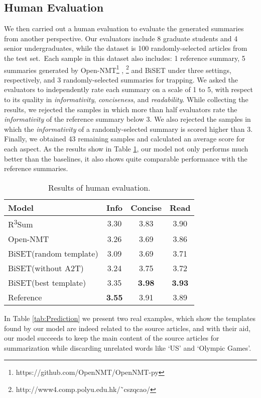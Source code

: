 \documentclass[11pt,a4paper]{article}
\begin{document}
\begin{spacing}{1.0}
\subsection{Human Evaluation}
We then carried out a human evaluation to evaluate the generated summaries from another perspective. Our evaluators include 8 graduate students and 4 senior undergraduates, while the dataset is 100 randomly-selected articles from the test set.~Each sample in this dataset also includes: 1 reference summary, 5 summaries generated by Open-NMT\footnote{https://github.com/OpenNMT/OpenNMT-py} \cite{opennmt}, \footnote{http://www4.comp.polyu.edu.hk/˜cszqcao/} \cite{cao2018retrieve} and BiSET under three settings, respectively, and 3 randomly-selected summaries for trapping. We asked the evaluators to independently rate each summary on a scale of 1 to 5, with respect to its quality in \emph{informativity}, \emph{conciseness}, and \emph{readability}. While collecting the results, we rejected the samples in which more than half evaluators rate the \emph{informativity} of the reference summary below 3. We also rejected the samples in which the \emph{informativity} of a randomly-selected summary is scored higher than 3. Finally, we obtained 43 remaining samples and calculated an average score for each aspect. As the results show in Table \ref{tab:human evaluation}, our model not only performs much better than the baselines, it also shows quite comparable performance with the reference summaries.


\begin{table}[h]
	\centering
	\begin{tabular}{@{}l|ccc@{}}
		\toprule
        Model & Info   & Concise & Read  \\
        \hline
        R\textsuperscript{3}Sum & 3.30 & 3.83 & 3.90 \\
        Open-NMT  & 3.26 & 3.69 & 3.86 \\
        BiSET(random template)  & 3.09 & 3.69 & 3.71 \\
        BiSET(without A2T)& 3.24 & 3.75 & 3.72 \\
        BiSET(best template) & 3.35 & \textbf{3.98} & \textbf{3.93} \\
        Reference& \textbf{3.55} & 3.91 & 3.89 \\
        \bottomrule
	\end{tabular}
	\caption{Results of human evaluation.}
\label{tab:human evaluation}
\end{table}

In Table \ref{tab:Prediction} we present two real examples, which show the templates found by our model are indeed related to the source articles, and with their aid, our model succeeds to keep the main content of the source articles for summarization while discarding unrelated words like `US' and `Olympic Games'.


\end{spacing}
\end{document}

